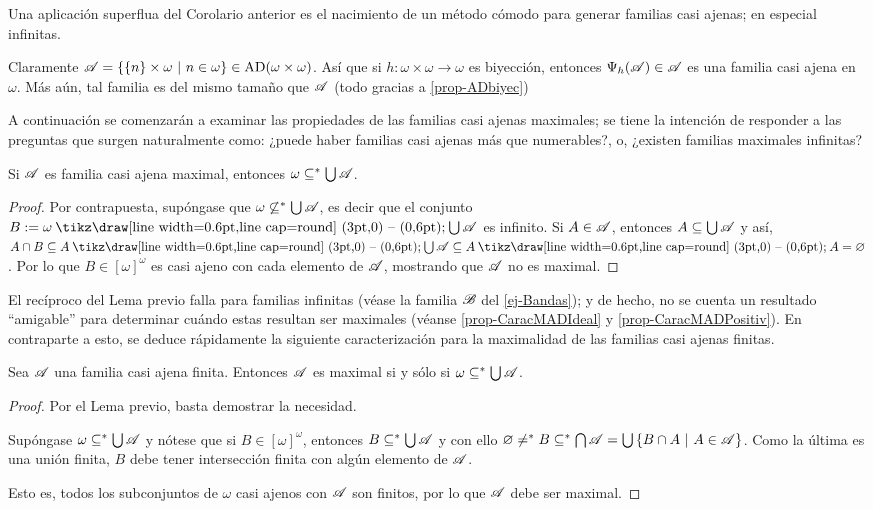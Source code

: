 Una aplicación superflua del Corolario anterior es el nacimiento de un método cómodo para generar familias casi ajenas; en especial infinitas.

\begin{ejemplo}
	\label{ej-Bandas}
	Claramente $\mathscr{A}=\{ \{n\} \times \omega \text{ $|$ } n \in \omega \} \in \operatorname{AD}(\omega \times \omega)$. Así que si $h:\omega \times \omega \to \omega$ es biyección, entonces $\Psi_h(\mathscr{A}) \in \mathscr{A}$ es una familia casi ajena en $\omega$. Más aún, tal familia es del mismo tamaño que $\mathscr{A}$ (todo gracias a \ref{prop-ADbiyec})
\end{ejemplo}

A continuación se comenzarán a examinar las propiedades de las familias casi ajenas maximales; se tiene la intención de responder a las preguntas que surgen naturalmente como: ¿puede haber familias casi ajenas más que numerables?, o, ¿existen familias maximales infinitas?

\begin{lema}\label{lem-MADnecesarioUnion}
	Si $\mathscr{A}$ es familia casi ajena maximal, entonces $\omega \subseteq^* \mbox{$\bigcup$}\, \mathscr{A}$.
\end{lema}

\begin{proof}
	Por contrapuesta, supóngase que $\omega \not\subseteq^* \mbox{$\bigcup$}\, \mathscr{A}$, es decir que el conjunto $B:=\omega \setminus \midcup \ms{A}$ es infinito. Si $A \in \mathscr{A}$, entonces $A \subseteq \mbox{$\bigcup$}\, \mathscr{A}$ y así, $A \cap B \subseteq A \setminus \midcup \ms{A} \subseteq A \setminus A = \emptyset$. Por lo que $B \in [\omega]^\omega$ es casi ajeno con cada elemento de $\mathscr{A}$, mostrando que $\mathscr{A}$ no es maximal.
\end{proof}

El recíproco del Lema previo falla para familias infinitas (véase la familia $\mathscr{B}$ del \autoref{ej-Bandas}); y de hecho, no se cuenta un resultado ``amigable'' para determinar cuándo estas resultan ser maximales (véanse \ref{prop-CaracMADIdeal} y \ref{prop-CaracMADPositiv}). En contraparte a esto, se deduce rápidamente la siguiente caracterización para la maximalidad de las familias casi ajenas finitas.

\begin{corolario}\label{cor-MADnecesarioUnion}
	Sea $\mathscr{A}$ una familia casi ajena finita. Entonces $\mathscr{A}$ es maximal si y sólo si $\omega \subseteq^* \mbox{$\bigcup$}\, \mathscr{A}$.
\end{corolario}

\begin{proof}
	Por el Lema previo, basta demostrar la necesidad.

	Supóngase $\omega \subseteq^* \mbox{$\bigcup$}\, \mathscr{A}$ y nótese que si $B \in [\omega]^\omega$, entonces $B \subseteq^*\mbox{$\bigcup$}\, \mathscr{A}$ y con ello $\varnothing \neq^* B  \subseteq^* \mbox{$\bigcap$}\, \mathscr{A} = \mbox{$\bigcup$}\,\{B \cap A \text{ $|$ } A \in \mathscr{A}\}$. Como la última es una unión finita, $B$ debe tener intersección finita con algún elemento de $\mathscr{A}$.

	Esto es, todos los subconjuntos de $\omega$ casi ajenos con $\mathscr{A}$ son finitos, por lo que $\mathscr{A}$ debe ser maximal.
\end{proof}


